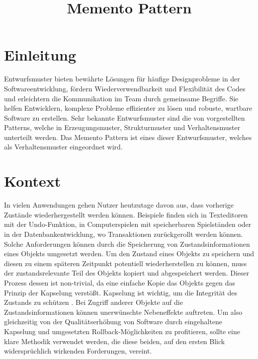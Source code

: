 \documentclass[9pt,conference]{IEEEtran}
\begin{document}
\title{Memento Pattern\\
}

\author{
}

\maketitle

\section{Einleitung}
Entwurfsmuster bieten bewährte Lösungen für häufige Designprobleme in der Softwareentwicklung, fördern Wiederverwendbarkeit und Flexibilität des Codes und erleichtern die Kommunikation im Team durch gemeinsame Begriffe. 
Sie helfen Entwicklern, komplexe Probleme effizienter zu lösen und robuste, wartbare Software zu erstellen. 
Sehr bekannte Entwurfsmuster sind die von  vorgestellten Patterns, welche in Erzeugungsmuster, Strukturmuster und Verhaltensmuster unterteilt werden.
Das Memento Pattern ist eines dieser Entwurfsmuster, welches als Verhaltensmuster eingeordnet wird.

\section{Kontext}
In vielen Anwendungen gehen Nutzer heutzutage davon aus, dass vorherige Zustände wiederhergestellt werden können. Beispiele finden sich in Texteditoren mit der \glqq{}Undo\grqq{}-Funktion, in Computerspielen mit speicherbaren Spielständen oder in der Datenbankentwicklung, wo Transaktionen zurückgerollt werden können. Solche Anforderungen können durch die Speicherung von Zustandsinformationen eines Objekts umgesetzt werden.
Um den Zustand eines Objekts zu speichern und diesen zu einem späteren Zeitpunkt potentiell wiederherstellen zu können, muss der zustandsrelevante Teil des Objekts kopiert und abgespeichert werden.
Dieser Prozess dessen ist non-trivial, da eine einfache Kopie das Objekts gegen das Prinzip der Kapselung verstößt.
Kapselung ist wichtig, um die Integrität des Zustands zu schützen \cite{encapsulation}.
Bei Zugriff anderer Objekte auf die Zustandsinformationen können unerwünschte Nebeneffekte auftreten.
Um also gleichzeitig von der Qualitätserhöhung von Software durch eingehaltene Kapselung und umgesetzten Rollback-Möglichkeiten zu profitieren, sollte eine klare Methodik verwendet werden, die diese beiden, auf den ersten Blick widersprüchlich wirkenden Forderungen, vereint.
\end{document}
